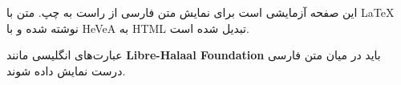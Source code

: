 \begin{faPar}
این صفحه آزمایشی است برای نمایش متن فارسی از راست به چپ. متن با LaTeX نوشته شده و با
HeVeA به HTML تبدیل شده است.
\end{faPar}

\begin{faPar}
عبارت‌های انگلیسی مانند \textbf{Libre-Halaal Foundation} باید در میان متن فارسی درست نمایش داده شوند.
\end{faPar}

